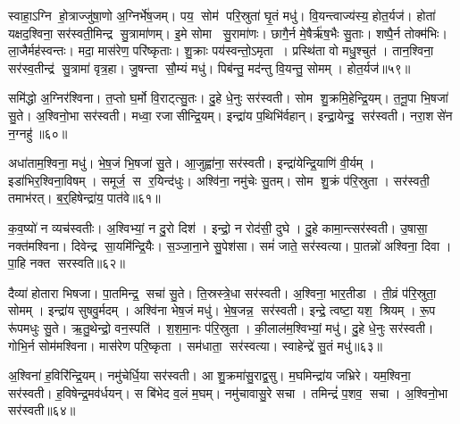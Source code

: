 स्वाहा॒ऽग्नि हो॒त्राज्जु॑षा॒णो अ॒ग्निर्भे॑ष॒जम्। पय॒ सोम॑ परि॒स्रुता॑ घृ॒तं मधु॑। वि॒यन्त्वाज्य॑स्य॒ होत॒र्यज॑। होता॑ यक्षद॒श्विना॒ सर॑स्वती॒मिन्द्र सु॒त्रामा॑णम्। इ॒मे सोमा सु॒रामा॑णः। छागै॒र्न मे॒षैर्\mbox{}ऋ॑ष॒भैः सु॒ताः। शष्पै॒र्न तोक्म॑भिः। ला॒जैर्मह॑स्वन्तः। मदा॒ मास॑रेण॒ परि॑ष्कृताः। शु॒क्राः पय॑स्वन्तो॒ऽमृता। प्रस्थि॑ता वो मधु॒श्चुत॑। तान॒श्विना॒ सर॑स्व॒तीन्द्र॑ सु॒त्रामा॑ वृत्र॒हा। जु॒षन्ता सौ॒म्यं मधु॑। पिब॑न्तु॒ मद॑न्तु वि॒यन्तु॒ सोमम्। होत॒र्यज॑॥५९॥\anuvakamend[वी॒र्यं॑ वि॒यन्त्वाज्य॑स्य॒ होत॒र्यज॒ नास॑त्या॒ सर॑स्वती॒ मधु॑ हिर॒ण्ययं॑ भेष॒जं वि॒यन्त्वाज्य॑स्य॒ होत॒र्यजाज्य॒पान॒मृता॒ पञ्च॑ च (स॒मिधा॒ऽग्नि षट्। तनू॒नपात्स॒प्त। नरा॒शस॒मृषि॑। इ॒डेडि॒तो यवै॑र॒ष्टौ। ब॒र्‌हि॒ स॒प्त। दुरो॒ऽश्विना॒ नव॑। सु॒पेश॒सर्‌षि॑। दैव्या॒ होता॑रा॒ सीसे॑न॒ रस॑। ति॒स्रस्त्वष्टा॑रम॒ष्टाव॑ष्टौ। वन॒स्पति॒मृषि॑। अ॒ग्निन्त्रयो॑दश। अ॒श्विना॒ द्वाद॑श त्रयोदश। स॒मिधा॒ऽग्निं बद॑रै॒र्बद॑रै॒र्यवै॑र॒श्विना॒ त्विषि॑म॒श्विना॒ न भे॑ष॒ज रू॒पम॒श्विना॑ भी॒मं भामम् ॥ )]

समि॑द्धो अ॒ग्निर॑श्विना। त॒प्तो घ॒र्मो वि॒राट्त्सु॒तः। दु॒हे धे॒नुः सर॑स्वती। सोम शु॒क्रमि॒हेन्द्रि॒यम्। त॒नू॒पा भि॒षजा॑ सु॒ते। अ॒श्विनो॒भा सर॑स्वती। मध्वा॒ रजासीन्द्रि॒यम्। इन्द्रा॑य प॒थिभि॑र्वहान्। इन्द्रा॒येन्दु॒ सर॑स्वती। नरा॒शसे॑न न॒ग्नहु॑॥६०॥

अधा॑ताम॒श्विना॒ मधु॑। भे॒ष॒जं भि॒षजा॑ सु॒ते। आ॒जुह्वा॑ना॒ सर॑स्वती। इन्द्रा॑येन्द्रि॒याणि॑ वी॒र्यम्। इडा॑भिर॒श्विना॒विषम्। समूर्ज॒ स र॒यिन्द॑धुः। अश्वि॑ना॒ नमु॑चेः सु॒तम्। सोम शु॒क्रं प॑रि॒स्रुता। सर॑स्वती॒ तमाभ॑रत्। ब॒र्॒हिषेन्द्रा॑य॒ पात॑वे॥६१॥

क॒व॒ष्यो॑ न व्यच॑स्वतीः। अ॒श्विभ्यां॒ न दु॒रो दिश॑। इन्द्रो॒ न रोद॑सी॒ दुघे। दु॒हे कामा॒न्त्सर॑स्वती। उ॒षासा॒ नक्त॑मश्विना। दिवेन्द्र सा॒यमि॑न्द्रि॒यैः। स॒ञ्जा॒ना॒ने सु॒पेश॑सा। समं॑ जाते॒ सर॑स्वत्या। पा॒तन्नो॑ अश्विना॒ दिवा। पा॒हि नक्त सरस्वति॥६२॥

दैव्या॑ होतारा भिषजा। पा॒तमिन्द्र॒ सचा॑ सु॒ते। ति॒स्रस्त्रे॒धा सर॑स्वती। अ॒श्विना॒ भार॒तीडा। ती॒व्रं प॑रि॒स्रुता॒ सोमम्। इन्द्रा॑य सुषवु॒र्मदम्। अश्वि॑ना भेष॒जं मधु॑। भे॒ष॒जन्न॒ सर॑स्वती। इन्द्रे॒ त्वष्टा॒ यश॒ श्रियम्। रू॒प रू॑पमधुः सु॒ते। ऋ॒तु॒थेन्द्रो॒ वन॒स्पति॑। श॒श॒मा॒नः प॑रि॒स्रुता। की॒लाल॑म॒श्विभ्यां॒ मधु॑। दु॒हे धे॒नुः सर॑स्वती। गोभि॒र्न सोम॑मश्विना। मास॑रेण परि॒ष्कृता। सम॑धाता॒ सर॑स्वत्या। स्वाहेन्द्रे॑ सु॒तं मधु॑॥६३॥\anuvakamend[न॒ग्नहु॒ पात॑वे सरस्वत्यधुः सु॒तेऽष्टौ च॑]

अ॒श्विना॑ ह॒विरि॑न्द्रि॒यम्। नमु॑चेर्धि॒या सर॑स्वती। आ शु॒क्रमा॑सु॒राद्व॒सु। म॒घमिन्द्रा॑य जभ्रिरे। यम॒श्विना॒ सर॑स्वती। ह॒विषेन्द्र॒मव॑र्धयन्। स बि॑भेद व॒लं म॒घम्। नमु॑चावासु॒रे सचा। तमिन्द्रं॑ प॒शव॒ सचा। अ॒श्विनो॒भा सर॑स्वती॥६४॥

